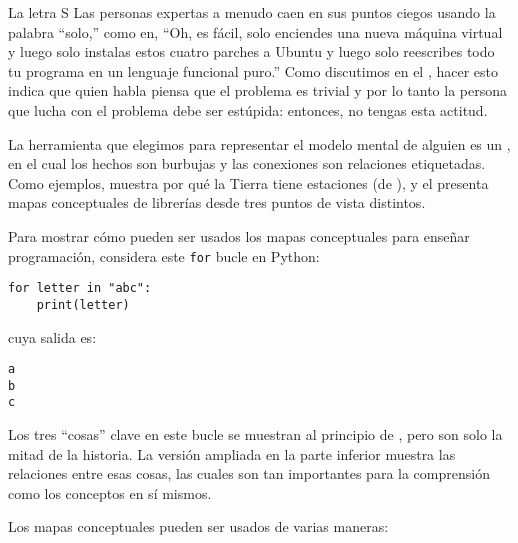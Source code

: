 \begin{aside}{La letra S}
 Las personas expertas a menudo caen en sus puntos ciegos usando la palabra ``solo,''
  como en,
  ``Oh, es fácil, solo enciendes una nueva máquina virtual
  y luego solo instalas estos cuatro parches a Ubuntu
  y luego solo reescribes todo tu programa en un lenguaje funcional puro.''
  Como discutimos en el ,
  hacer esto indica que quien habla piensa que el problema es trivial
  y por lo tanto la persona que lucha con el problema debe ser estúpida:
  entonces, no tengas esta actitud.


\end{aside}


La herramienta que elegimos para representar el modelo mental de alguien es un ,
en el cual los hechos son burbujas y las conexiones son relaciones etiquetadas.
Como ejemplos,
 muestra por qué la Tierra tiene estaciones (de ),
y el  presenta mapas conceptuales de librerías desde tres puntos de vista distintos.


Para mostrar cómo pueden ser usados los mapas conceptuales para enseñar programación,
considera este \texttt{for} bucle en Python:

\begin{verbatim}
for letter in "abc":
    print(letter)
\end{verbatim}

\noindent
cuya salida es:

\begin{verbatim}
a
b
c
\end{verbatim}

Los tres ``cosas'' clave en este bucle se muestran al principio de ,
pero son solo la mitad de la historia.
La versión ampliada en la parte inferior muestra las relaciones entre esas cosas,
las cuales son tan importantes para la comprensión como los conceptos en sí mismos.


\newpage
Los mapas conceptuales pueden ser usados de varias maneras:

